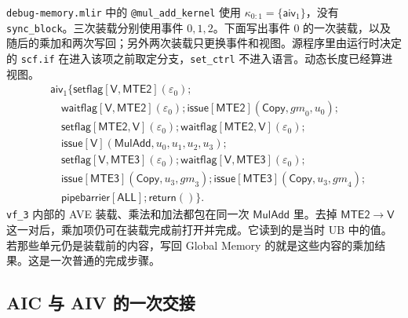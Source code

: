 \documentclass[UTF8,a4paper,11pt,fontset=fandol]{ctexart}
\newcommand{\kw}[1]{\ensuremath{\mathsf{#1}}}
\begin{document}
\texttt{debug-memory.mlir} 中的 \texttt{@mul\_add\_kernel} 使用 $\kappa_{0:1}=\{\mathsf{aiv}_1\}$，没有 \texttt{sync\_block}。三次装载分别使用事件 $0,1,2$。下面写出事件 $0$ 的一次装载，以及随后的乘加和两次写回；另外两次装载只更换事件和视图。源程序里由运行时决定的 \texttt{scf.if} 在进入该项之前取定分支，\texttt{set\_ctrl} 不进入语言。动态长度已经算进视图。
\[
\begin{aligned}
&\mathsf{aiv}_1\{
  \kw{setflag}[\mathsf{V},\mathsf{MTE2}](\varepsilon_0);\\
&\quad\kw{waitflag}[\mathsf{V},\mathsf{MTE2}](\varepsilon_0);
  \kw{issue}[\mathsf{MTE2}](\kw{Copy},\mathit{gm}_0,u_0);\\
&\quad\kw{setflag}[\mathsf{MTE2},\mathsf{V}](\varepsilon_0);
  \kw{waitflag}[\mathsf{MTE2},\mathsf{V}](\varepsilon_0);\\
&\quad\kw{issue}[\mathsf{V}](\kw{MulAdd},u_0,u_1,u_2,u_3);\\
&\quad\kw{setflag}[\mathsf{V},\mathsf{MTE3}](\varepsilon_0);
  \kw{waitflag}[\mathsf{V},\mathsf{MTE3}](\varepsilon_0);\\
&\quad  \kw{issue}[\mathsf{MTE3}](\kw{Copy},u_3,\mathit{gm}_3);
  \kw{issue}[\mathsf{MTE3}](\kw{Copy},u_3,\mathit{gm}_4);\\
&\quad\kw{pipebarrier}[\mathsf{ALL}];
  \kw{return}()\}.
\end{aligned}
\]
\texttt{vf\_3} 内部的 AVE 装载、乘法和加法都包在同一次 $\kw{MulAdd}$ 里。去掉 $\mathsf{MTE2}\to\mathsf{V}$ 这一对后，乘加项仍可在装载完成前打开并完成。它读到的是当时 UB 中的值。若那些单元仍是装载前的内容，写回 Global Memory 的就是这些内容的乘加结果。这是一次普通的完成步骤。

\subsection{AIC 与 AIV 的一次交接}
\end{document}
